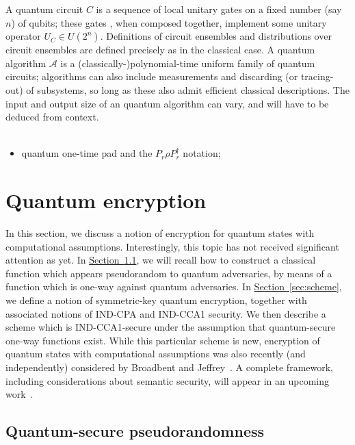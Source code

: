 \documentclass[11pt]{article}
\numberwithin{equation}{section}
\newcommand{\expref}[2]{\texorpdfstring{\hyperref[#2]{#1~\ref{#2}}}{#1~\ref{#2}}}
\newcommand{\ga}[1]{{ \textcolor{purple}{(Gorjan:  #1)}}{}}
\begin{document}
{A quantum circuit $C$ is a sequence of local unitary gates on a fixed number (say $n$) of qubits; these gates , when composed together, implement some unitary operator $U_C \in U(2^n)$. Definitions of circuit ensembles and distributions over circuit ensembles are defined precisely as in the classical case. A quantum algorithm $\mathcal A$ is a (classically-)polynomial-time uniform family of quantum circuits; algorithms can also include measurements and discarding (or tracing-out) of subsystems, so long as these also admit efficient classical descriptions. The input and output size of an quantum algorithm can vary, and will have to be deduced from context.\\ \\

\noindent \ga{Bill, add any notations that need to be explained here:}
\begin{itemize}
\item quantum one-time pad and the $P_r \rho P_r^\dagger$ notation;
\end{itemize}

\section{Quantum encryption}\label{sec:encryption}

In this section, we discuss a notion of encryption for quantum states with computational assumptions.  Interestingly, this topic has not received significant attention as yet. In \expref{Section}{sec:pseudo}, we will recall how to construct a classical function which appears pseudorandom to quantum adversaries, by means of a function which is one-way against quantum adversaries. In \expref{Section}{sec:scheme}, we define a notion of symmetric-key quantum encryption, together with associated notions of IND-CPA and IND-CCA1 security. We then describe a scheme which is IND-CCA1-secure under the assumption that quantum-secure one-way functions exist. While this particular scheme is new, encryption of quantum states with computational assumptions was also recently (and independently) considered by Broadbent and Jeffrey~\cite{BJ15}. A complete framework, including considerations about semantic security, will appear in an upcoming work~\cite{ABFGSS15}.

\subsection{Quantum-secure pseudorandomness}\label{sec:pseudo}

}
\end{document}
